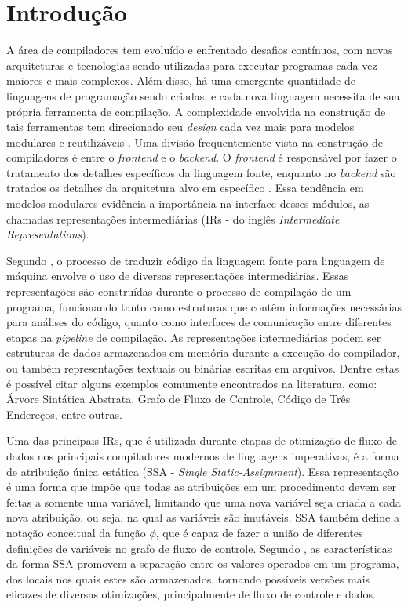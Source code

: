 
\chapter{Introdução}

A área de compiladores tem evoluído e enfrentado desafios contínuos, com novas arquiteturas e tecnologias sendo utilizadas para executar programas cada vez maiores e mais complexos. Além disso, há uma emergente quantidade de linguagens de programação sendo criadas, e cada nova linguagem necessita de sua própria ferramenta de compilação. A complexidade envolvida na construção de tais ferramentas tem direcionado seu \emph{design} cada vez mais para modelos modulares e reutilizáveis \cite{muchnick1997advanced}. Uma divisão frequentemente vista na construção de compiladores é entre o \emph{frontend} e o \emph{backend}. O \emph{frontend} é responsável por fazer o tratamento dos detalhes específicos da linguagem fonte, enquanto no \emph{backend} são tratados os detalhes da arquitetura alvo em específico \cite{dragao}. Essa tendência em modelos modulares evidência a importância na interface desses módulos, as chamadas representações intermediárias (IRs - do inglês \emph{Intermediate Representations}).

Segundo , o processo de traduzir código da linguagem fonte para linguagem de máquina envolve o uso de diversas representações intermediárias. Essas representações são construídas durante o processo de compilação de um programa, funcionando tanto como estruturas que contêm informações necessárias para análises do código, quanto como interfaces de comunicação entre diferentes etapas na \emph{pipeline} de compilação. As representações intermediárias podem ser estruturas de dados armazenados em memória durante a execução do compilador, ou também representações textuais ou binárias escritas em arquivos. Dentre estas é possível citar alguns exemplos comumente encontrados na literatura, como: Árvore Sintática Abstrata, Grafo de Fluxo de Controle, Código de Três Endereços, entre outras.

Uma das principais IRs, que é utilizada durante etapas de otimização de fluxo de dados nos principais compiladores modernos de linguagens imperativas, é a forma de atribuição única estática (SSA - \emph{Single Static-Assignment}). Essa representação é uma forma que impõe que todas as atribuições em um procedimento devem ser feitas a somente uma variável, limitando que uma nova variável seja criada a cada nova atribuição, ou seja, na qual as variáveis são imutáveis. SSA também define a notação conceitual da função $\phi$, que é capaz de fazer a união de diferentes definições de variáveis no grafo de fluxo de controle. Segundo , as características da forma SSA promovem a separação entre os valores operados em um programa, dos locais nos quais estes são armazenados, tornando possíveis versões mais eficazes de diversas otimizações, principalmente de fluxo de controle e dados.

